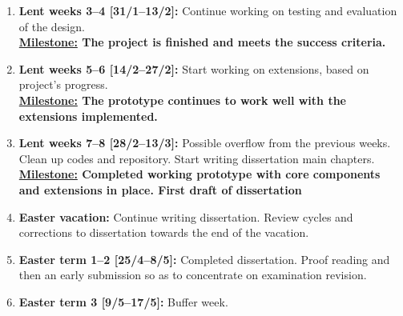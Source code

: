 \begin{enumerate}
	\item \textbf{Lent weeks 3--4 [31/1--13/2]:} Continue working on testing and evaluation of the design.
	\\
	\textbf{\underline{Milestone:} The project is finished and meets the success criteria.}
	
	\item \textbf{Lent weeks 5--6 [14/2--27/2]:} Start working on extensions, based on project's progress.
	\\
	\textbf{\underline{Milestone:} The prototype continues to work well with the extensions implemented.}
	
	\item \textbf{Lent weeks 7--8 [28/2--13/3]:} Possible overflow from the previous weeks. Clean up codes and repository. Start writing dissertation main chapters.
	\\
	\textbf{\underline{Milestone:} Completed working prototype with core components and extensions in place. First draft of dissertation}
	
	\item \textbf{Easter vacation:} Continue writing dissertation. Review cycles and corrections to dissertation towards the end of the vacation.
	
	\item \textbf{Easter term 1--2 [25/4--8/5]:}  Completed dissertation. Proof reading and then an early submission so as to concentrate on examination revision.
	
	\item \textbf{Easter term 3 [9/5--17/5]:} Buffer week.
\end{enumerate}